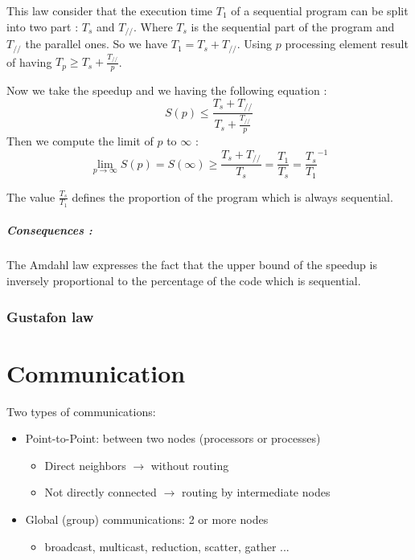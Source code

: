 \documentclass[11pt,a4paper]{report}
\begin{document}
This law consider that the execution time $T_1$ of a sequential program can be split into two part : $T_s$ and $T_{//}$. Where $T_s$ is the sequential part of the program and $T_{//}$ the parallel ones. So we have $T_1 = T_s + T_{//}$. Using $p$ processing element result of having $T_p \geq T_s + \frac{T_{//}}{p}$.

Now we take the speedup and we having the following equation :
$$
S(p) \leq \frac{T_s+T_{//}}{T_s + \frac{T_{//}}{p}}
$$
Then we compute the limit of $p$ to $\infty$ :
$$
\lim_{p\rightarrow \infty} S(p) = S(\infty) \geq \frac{T_s + T_{//}}{T_s} = \frac{T_1}{T_s} = \frac{T_s}{T_1}^{-1}
$$

The value $\frac{T_s}{T_1}$ defines the proportion of the program which is always sequential.

\paragraph*{Consequences :} The Amdahl law expresses the fact that the upper bound of the speedup is inversely proportional to the percentage of the code which is sequential.


\subsection{Gustafon law} %
\label{sub:Gustafon law}






\chapter{Communication} %
\label{cha:Communication}

Two types of communications:

\begin{itemize}
    \item Point-to-Point: between two nodes (processors or processes)
        \begin{itemize}
            \item Direct neighbors \(\rightarrow\) without routing
            \item Not directly connected \(\rightarrow\) routing by 
            intermediate nodes
        \end{itemize}
        
    \item Global (group) communications: 2 or more nodes
        \begin{itemize}
            \item broadcast, multicast, reduction, scatter, gather ...
        \end{itemize}
\end{itemize}
\end{document}

